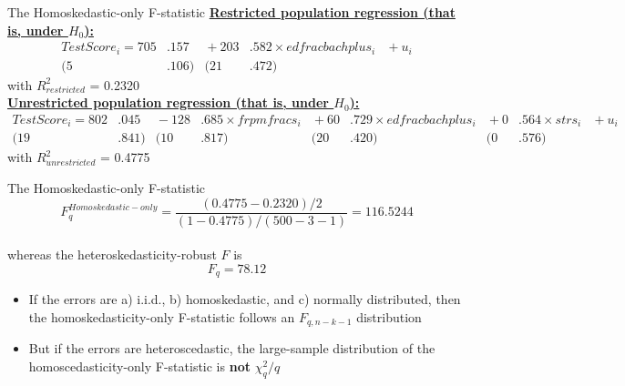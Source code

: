 \documentclass[notes,10pt, aspectratio=169]{beamer}
\begin{document}
\begin{frame}{The Homoskedastic-only F-statistic}
\underline{\textbf{Restricted population regression (that is, under $H_0$):}}
\begin{equation*}
  \begin{alignedat}{2}
    TestScore_i = 705&.157 &{}+ 203&.582 \times edfracbachplus_i &{} + u_i\\
        (5&.106)  &   (21&.472) &
  \end{alignedat}
\end{equation*}
with $R^2_{restricted}$ = 0.2320\\[2em]
\underline{\textbf{Unrestricted population regression (that is, under $H_0$):}}
\begin{equation*}
  \begin{alignedat}{4}
    TestScore_i = 802&.045 &{} -128&.685 \times frpmfracs_i &{} +  60&.729 \times edfracbachplus_i &{}+  0&.564 \times strs_i &{}+ u_i\\
    (19&.841)  &   (10&.817) & (20&.420) & (0&.576) &
  \end{alignedat}   
\end{equation*}
with $R^2_{unrestricted}$ = 0.4775
\end{frame}

\begin{frame}{The Homoskedastic-only F-statistic}
\begin{equation*}
    F^{Homoskedastic-only}_q=\frac{(0.4775-0.2320)/2}{(1-0.4775)/(500-3-1)}=116.5244
\end{equation*}
\\[1em] whereas the heteroskedasticity-robust $F$ is
\begin{equation*}
    F_q=78.12
\end{equation*}
\begin{itemize}
    \item If the errors are a) i.i.d., b) homoskedastic, and c) normally distributed, then the homoskedasticity-only F-statistic follows an $F_{q,n-k-1}$ distribution
    \item But if the errors are heteroscedastic, the large-sample distribution of the homoscedasticity-only F-statistic is \textbf{not} $\chi^2_q/q$
\end{itemize}


\end{frame}
\end{document}
